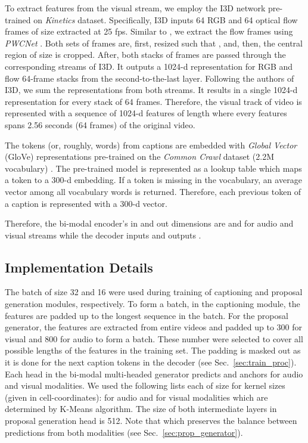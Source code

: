 \documentclass{src/bmvc2k}
\begin{document}
To extract features from the visual stream, we employ the I3D network \cite{i3d_Carreira_2017} pre-trained on \textit{Kinetics} dataset. Specifically, I3D inputs 64 RGB and 64 optical flow frames of size  extracted at 25 fps. Similar to \cite{mdvc_Iashin_2020}, we extract the flow frames using \textit{PWCNet} \cite{Sun2018PWC-Net}. Both sets of frames are, first, resized such that , and, then, the central region of size  is cropped. After, both stacks of frames are passed through the corresponding streams of I3D. It outputs a 1024-d representation for RGB and flow 64-frame stacks from the second-to-the-last layer. Following the authors of I3D, we sum the representations from both streams. It results in a single 1024-d representation for every stack of 64 frames. Therefore, the visual track of  video is represented with a sequence of 1024-d features of length  where every features spans 2.56 seconds (64 frames) of the original video.

The tokens (or, roughly, words) from captions are embedded with \textit{Global Vector} (GloVe) representations pre-trained on the \textit{Common Crawl} dataset (2.2M vocabulary) \cite{Glove_Pennington_2014}. The pre-trained model is represented as a lookup table which maps a token to a 300-d embedding. If a token is missing in the vocabulary, an average vector among all vocabulary words is returned. Therefore, each previous token of a caption is represented with a 300-d vector.

Therefore, the bi-modal encoder's in and out dimensions are  and  for audio and visual streams while the decoder inputs and outputs .

\subsection{Implementation Details \label{sec:implementation}}

The batch of size 32 and 16 were used during training of captioning and proposal generation modules, respectively. To form a batch, in the captioning module, the features are padded up to the longest sequence in the batch. For the proposal generator, the features are extracted from entire videos and padded up to 300 for visual and 800 for audio to form a batch. These number were selected to cover all possible lengths of the features in the training set. The padding is masked out as it is done for the next caption tokens in the decoder (see Sec.~\ref{sec:train_proc}). Each head in the bi-modal multi-headed generator predicts  and  anchors for audio and visual modalities. We used the following lists each of size  for kernel sizes (given in cell-coordinates):  for audio and  for visual modalities which are determined by K-Means algorithm. The size of both intermediate layers in proposal generation head is 512. Note that  which preserves the balance between predictions from both modalities (see Sec.~\ref{sec:prop_generator}).
\end{document}
